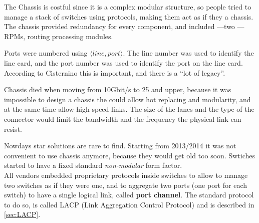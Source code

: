 The Chassis is costful since it is a complex modular structure, so people tried to manage a stack of switches using protocols, making them act as if they a chassis.
The chassis provided redundancy for every component, and included ---two \smiley --- RPMs, routing processing modules.

Ports were numbered using $\langle line , port\rangle$. The line number was used to identify the line card, and the port number was used to identify the port on the line card. According to Cisternino this is important, and there is a ``lot of legacy''.

Chassis died when moving from 10Gbit/s to 25 and upper, because it was impossible to design a chassis the could allow hot replacing and modularity, and at the same time allow high speed links.
The size of the lanes and the type of the connector would limit the bandwidth and the frequency the physical link can resist.

Nowdays star solutions are rare to find. Starting from 2013/2014 it was not convenient to use chassis anymore, because they would get old too soon.
Swtiches started to have a fixed standard \textit{non-modular} form factor.\\
All vendors embedded proprietary protocols inside switches to allow to manage two switches as if they were one, and to aggregate two ports (one port for each switch) to have a single logical link, called \textbf{port channel}.
The standard protocol to do so, is called LACP (Link Aggregation Control Protocol) and is described in \ref{sec:LACP}.

